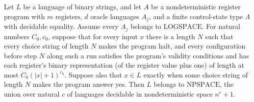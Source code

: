 \begin{theorem}
\label{Complexity.LogProg.narm_decides_npspace_of_logspace}
\leanok
{}
Let $L$ be a language of binary strings, and let $A$ be a nondeterministic register program
with $m$ registers, $d$ oracle languages $A_j$, and a finite control-state type $\Lambda$
with decidable equality. Assume every $A_j$ belongs to $\mathrm{LOGSPACE}$. For natural
numbers $C_0,c_0$, suppose that for every input $x$ there is a length $N$
such that every choice string of length $N$ makes the program halt, and every
configuration before step $N$ along such a run satisfies the program's validity
conditions and has each register's binary representation (of the register value plus
one) of length at most $C_0(|x|+1)^{c_0}$. Suppose also that $x\in L$ exactly when some
choice string of length $N$ makes the program answer yes. Then $L$ belongs to
$\text{NPSPACE}$, the union over natural $c$ of languages decidable in nondeterministic
space $n^c+1$.
\end{theorem}
